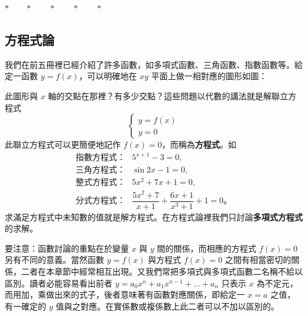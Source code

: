 \begin{center}
$* \qquad * \qquad * \qquad * \qquad *$
\end{center}

\subsection{方程式論}\label{sec:b6-2-1}

我們在前五冊裡已經介紹了許多函數，如多項式函數、三角函數、指數函數等。給定一函數 $y=f(x)$，可以明確地在 $xy$ 平面上做一相對應的圖形如圖：

\begin{figure}[H]
\centering
{}
\end{figure}

此圖形與 $x$ 軸的交點在那裡？有多少交點？這些問題以代數的講法就是解聯立方程式
\[ \begin{cases} y = f(x) \\ y = 0 \end{cases} \]
此聯立方程式可以更簡便地記作 $f(x)=0$，而稱為\textbf{方程式}。如
\begin{align*}
\text{指數方程式：}& 5^{x+1} - 3 = 0, \\
\text{三角方程式：}& \sin 2x - 1 = 0, \\
\text{整式方程式：}& 5x^2 + 7x + 1 = 0, \\
\text{分式方程式：}& \dfrac{5x^2+7}{x+1} + \dfrac{6x+1}{x^3+1} + 1 = 0 \text{。}
\end{align*}
求滿足方程式中未知數的值就是解方程式。在方程式論裡我們只討論\textbf{多項式方程式}的求解。

要注意：函數討論的重點在於變量 $x$ 與 $y$ 間的關係，而相應的方程式 $f(x)=0$ 另有不同的意義。當然函數 $y=f(x)$ 與方程式 $f(x)=0$ 之間有相當密切的關係，二者在本章節中經常相互出現。又我們常把多項式與多項式函數二名稱不給以區別。讀者必能容易看出前者 $y=a_0 x^n + a_1 x^{n-1} + \dots + a_n$ 只表示 $x$ 為不定元，而用加，乘做出來的式子，後者意味著有函數對應關係，即給定一 $x=a$ 之值，有一確定的 $y$ 值與之對應。在實係數或複係數上此二者可以不加以區別的。

